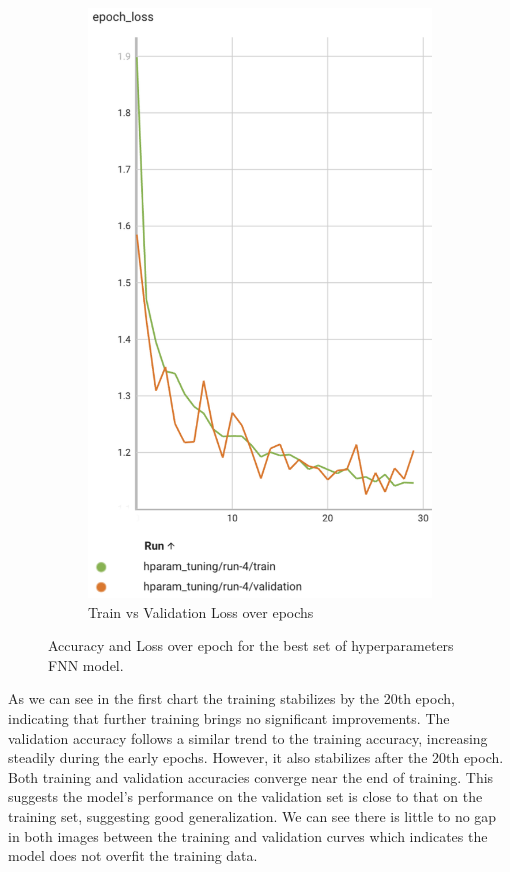\begin{figure}[H]
    \hfill
    \begin{subfigure}[t]{0.30\textwidth}
        \centering
        \includegraphics[width=\textwidth]{images/fnn_epoch_loss.png}
        \caption{Train vs Validation Loss over epochs}
        \label{fig:fnn_subfig2}
    \end{subfigure}
    \caption{Accuracy and Loss over epoch for the best set of hyperparameters FNN model.}
    \label{fig:images}
\end{figure}

As we can see in the first chart the training stabilizes by the 20th epoch, indicating that further training brings no significant improvements. The validation accuracy follows a similar trend to the training accuracy, increasing steadily during the early epochs. However, it also stabilizes after the 20th epoch. Both training and validation accuracies converge near the end of training. This suggests the model's performance on the validation set is close to that on the training set, suggesting good generalization. We can see there is little to no gap in both images between the training and validation curves which indicates the model does not overfit the training data.

